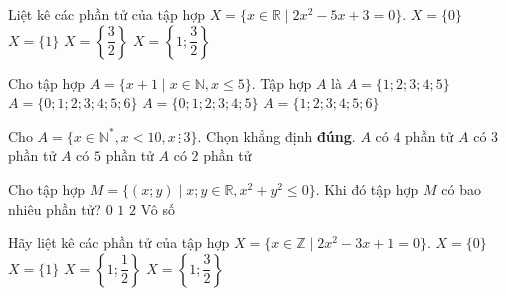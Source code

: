 \begin{ex}%
	Liệt kê các phần tử của tập hợp $X = \{x \in \mathbb{R} \mid 2x^2 - 5x + 3  = 0\}$.
	 \choice
		{$X =  \{0\}$}
		 {$X = \{1\}$}
		 {$X = \left\{\dfrac{3}{2}\right\}$}
		{\True $X =  \left\{1; \dfrac{3}{2}\right\}$}
\end{ex}

\begin{ex}%
	Cho  tập hợp $A = \{x+1 \mid x \in \mathbb{N}, x \leq 5\}$. Tập hợp $A$ là
	 \choice
		{$A = \{1; 2; 3; 4; 5\}$} 
		{$A =  \{0; 1; 2; 3; 4; 5; 6\}$}
		{$A = \{0;  1; 2; 3; 4; 5\}$}
		{\True $A = \{1;  2; 3; 4; 5; 6\}$}
\end{ex}

\begin{ex}%
	Cho $A = \{x \in \mathbb{N}^*, x <  10, x\,\vdots\, 3\}$. Chọn khẳng định \textbf{đúng}.
	\choice 
		{$A$ có $4$ phần tử} 
		{\True $A$  có $3$ phần tử}
		{$A$ có $5$  phần tử}
		{$A$ có $2$ phần  tử}
\end{ex}

\begin{ex}%
	Cho tập hợp  $M = \{(x; y) \mid x; y \in \mathbb{R}, x^2 + y^2 \leq 0\}$. Khi đó tập hợp $M$ có bao nhiêu phần tử?
	 \choice
		{$0$} 
		 {\True $1$}
		 {$2$}
		{Vô số} 
\end{ex}

\begin{ex}%
	 Hãy liệt kê các phần tử của tập hợp $X = \{x \in \mathbb{Z} \mid 2x^2 - 3x + 1 = 0\}$.
	 \choice
		{$X =  \{0\}$}
		{\True  $X = \{1\}$}
		{$X = \left\{1;  \dfrac{1}{2}\right\}$}
		{$X = \left\{1;  \dfrac{3}{2}\right\}$}
\end{ex}


